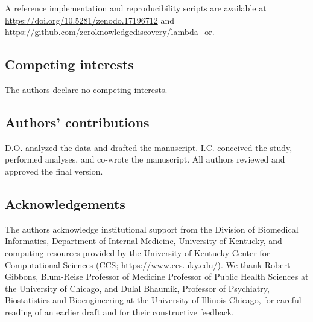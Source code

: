 \documentclass[pdflatex,sn-mathphys-num]{sn-jnl}%
\theoremstyle{thmstyleone}%
\theoremstyle{thmstyletwo}%
\theoremstyle{thmstylethree}%
\begin{document}
A reference implementation and reproducibility scripts are available at \url{https://doi.org/10.5281/zenodo.17196712} and \url{https://github.com/zeroknowledgediscovery/lambda_or}.

\subsection*{Competing interests}
The authors declare no competing interests.

\subsection*{Authors' contributions}
D.O. analyzed the data and drafted the manuscript. I.C. conceived the study, performed analyses, and co-wrote the manuscript. All authors reviewed and approved the final version.

\subsection*{Acknowledgements}
The authors acknowledge institutional support from the Division of Biomedical Informatics, Department of Internal Medicine, University of Kentucky, and computing resources provided by the University of Kentucky Center for Computational Sciences (CCS; \url{https://www.ccs.uky.edu/}). We thank Robert  Gibbons, Blum-Reise Professor of Medicine
Professor of Public Health Sciences at the University of Chicago, and Dulal Bhaumik,  Professor of Psychiatry, Biostatistics and Bioengineering at the University of Illinois Chicago, for careful reading of an earlier draft and for their constructive feedback.
\end{document}
